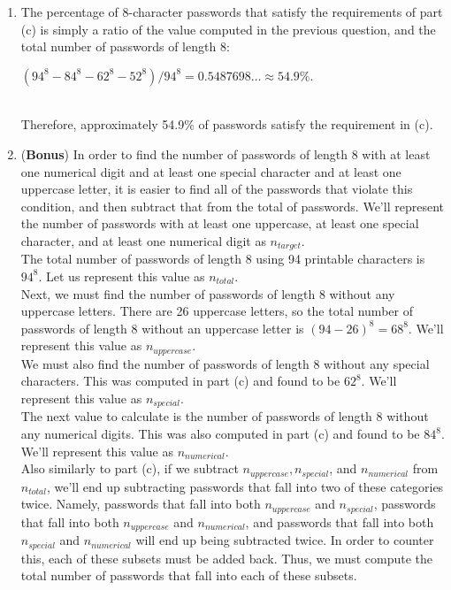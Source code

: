 \documentclass[11pt]{article}
\theoremstyle{definition}
\begin{document}
\begin{enumerate}
\begin{enumerate}
\item The percentage of 8-character passwords that satisfy the requirements of part (c) is simply a ratio of the value computed in the previous question, and the total number of passwords
of length 8:\\
\centerline{$(94^8 - 84^8 - 62^8 - 52^8)/94^8 = 0.5487698\ldots \approx 54.9\%.$}\\

Therefore, approximately 54.9\% of passwords satisfy the requirement in (c).\\

\item (\textbf{Bonus}) In order to find the number of passwords of length 8 with at least one numerical digit and at least one special character and at least one uppercase letter, it is easier to find
all of the passwords that violate this condition, and then subtract that from the total of passwords. We'll represent the number of passwords with at least one uppercase, at least one special character, and
at least one numerical digit as $n_{target}$.\\
The total number of passwords of length 8 using 94 printable characters is $94^8$. Let us represent this value as $n_{total}$.\\

Next, we must find the number of passwords of length 8 without any uppercase letters. There are 26 uppercase letters, so the total number of passwords of length 8 without an uppercase letter is $(94 - 26)^8 = 68^8$.
We'll represent this value as $n_{uppercase}$.\\

We must also find the number of passwords of length 8 without any special characters. This was computed in part (c) and found to be $62^8$. We'll represent this value as $n_{special}$.\\

The next value to calculate is the number of passwords of length 8 without any numerical digits. This was also computed in part (c) and found to be $84^8$. We'll represent this value as $n_{numerical}$.\\

Also similarly to part (c), if we subtract $n_{uppercase}, n_{special}$, and $n_{numerical}$ from $n_{total}$, we'll end up subtracting passwords that fall into two of these categories twice. Namely,
passwords that fall into both $n_{uppercase}$ and $n_{special}$, passwords that fall into both $n_{uppercase}$ and $n_{numerical}$, and passwords that fall into both $n_{special}$ and $n_{numerical}$ will end up
being subtracted twice. In order to counter this, each of these subsets must be added back. Thus, we must compute the total number of passwords that fall into each of these subsets.\\


\end{enumerate}
\end{enumerate}
\end{document}
